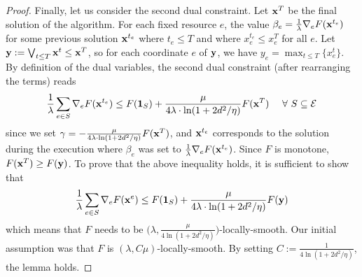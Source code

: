 \begin{proof}
Finally, let us consider the second dual constraint. Let $\mathbf{x}^T$ be the final solution of the algorithm. For each fixed resource $e$, the value $\beta_{e} = \frac{1}{\lambda} \nabla_{e} F(\mathbf{x}^{t_e})$ for some previous solution $\mathbf{x}^{t_e}$ where $t_e \le T$ and where $x^{t_e}_{e} \leq x^{T}_{e}$ for all $e$.
Let $\mathbf{y} := \bigvee_{t \le T} \mathbf{x}^{t} \leq \mathbf{x}^{T}$, so for each coordinate $e$ of $\mathbf{y}$, we have $y_{e} = \max_{t \le T}\{x^{t}_{e}\}$.
By definition of the dual variables, the second dual constraint (after rearranging the terms) reads
\begin{align*}
	\frac{1}{\lambda} \sum_{e \in S} \nabla_{e} F(\mathbf{x}^{t_e}) \leq F(\mathbf{1}_{S}) + \frac{\mu}{4\lambda \cdot \ln(1+2d^{2}/\eta)} F(\mathbf{x}^{T}) \ \ \ \ \forall\ S \subseteq \mathcal{E}
\end{align*}
since we set $\gamma = -\frac{\mu}{4\lambda \cdot \ln(1+2d^{2}/\eta)} F(\mathbf{x}^{T})$, and $\mathbf{x}^{t_e}$ corresponds to the solution during the execution where $\beta_e$ was set to $\frac{1}{\lambda} \nabla_{e} F(\mathbf{x}^{t_e})$.
Since $F$ is monotone, $F(\mathbf{x}^{T}) \geq F(\mathbf{y})$. To prove that the above inequality holds, it is sufficient to show that
\begin{align*}
	\frac{1}{\lambda} \sum_{e \in S} \nabla_{e} F(\mathbf{x}^{e}) \leq F(\mathbf{1}_{S}) + \frac{\mu}{4\lambda \cdot \ln(1+2d^{2}/\eta)} F(\mathbf{y})
\end{align*}
which means that $F$ needs to be  $\bigl(\lambda, \frac{\mu}{4\ln(1+2d^{2}/\eta)}\bigr)$-locally-smooth. Our initial assumption was that $F$ is $(\lambda, C \mu)$-locally-smooth. By setting $C := \frac{1}{4\ln(1+2d^{2}/\eta)}$, the lemma holds.
\end{proof}

